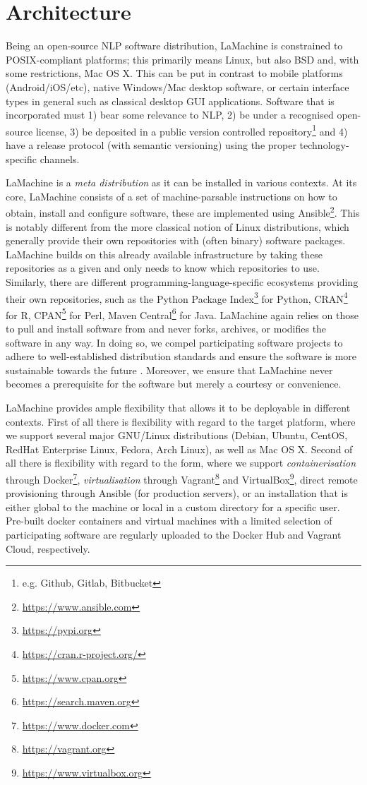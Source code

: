 \documentclass[a4paper,11pt]{article}
\begin{document}
\section{Architecture}

Being an open-source NLP software distribution, LaMachine is constrained to POSIX-compliant platforms; this primarily
means Linux, but also BSD and, with some restrictions, Mac OS X. This can be put in contrast to mobile platforms
(Android/iOS/etc), native Windows/Mac desktop software, or certain interface types in general such as classical desktop
GUI applications. Software that is incorporated must 1) bear some relevance to NLP, 2) be under a recognised
open-source license, 3) be deposited in a public version controlled repository\footnote{e.g. Github, Gitlab,
Bitbucket} and 4) have a release protocol (with semantic versioning) using the proper technology-specific channels.

LaMachine is a \emph{meta distribution} as it can be installed in various contexts. At its core, LaMachine consists of a
set of machine-parsable instructions on how to obtain, install and configure software, these are implemented using
Ansible\footnote{\url{https://www.ansible.com}}.  This is notably different from the more classical notion of Linux
distributions, which generally provide their own repositories with (often binary) software packages. LaMachine builds on
this already available infrastructure by taking these repositories as a given and only needs to know which
repositories to use.  Similarly, there are different programming-language-specific ecosystems providing their own
repositories, such as the Python Package Index\footnote{\url{https://pypi.org}} for Python,
CRAN\footnote{\url{https://cran.r-project.org/}} for R, CPAN\footnote{\url{https://www.cpan.org}} for Perl, Maven
Central\footnote{\url{https://search.maven.org}} for Java.  LaMachine again relies on those to pull and install
software from and never forks, archives, or modifies the software in any way. In doing so, we compel participating
software projects to adhere to well-established distribution standards and ensure the software is more sustainable
towards the future \cite{softwarequality}. Moreover, we ensure that LaMachine never becomes a prerequisite for the software but merely a
courtesy or convenience.

LaMachine provides ample flexibility that allows it to be deployable in different contexts. First of all there is
flexibility with regard to the target platform, where we support several major GNU/Linux distributions (Debian, Ubuntu,
CentOS, RedHat Enterprise Linux, Fedora, Arch Linux), as well as Mac OS X. Second of all there is flexibility with
regard to the form, where we support \emph{containerisation} through Docker\footnote{\url{https://www.docker.com}},
\emph{virtualisation} through Vagrant\footnote{\url{https://vagrant.org}} and VirtualBox\footnote{\url{https://www.virtualbox.org}},
direct remote provisioning through Ansible (for production servers), or an installation that is either global to the
machine or local in a custom directory for a specific user. Pre-built docker containers and virtual machines with a
limited selection of participating software are regularly uploaded to the Docker Hub and Vagrant Cloud, respectively.
\end{document}
